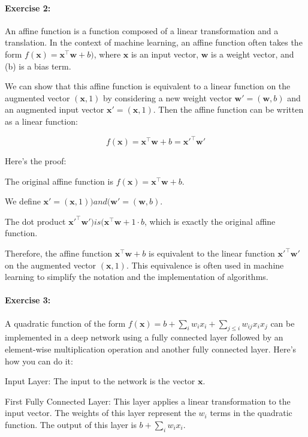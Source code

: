 \paragraph{Exercise 2:}

An affine function is a function composed of a linear transformation and a translation.
In the context of machine learning, an affine function often takes the form \(f(\mathbf{x}) = \mathbf{x}^\top \mathbf{w} + b)\), where \(\mathbf{x}\) is an input vector, \(\mathbf{w}\) is a weight vector, and (b) is a bias term.

We can show that this affine function is equivalent to a linear function on the augmented vector \((\mathbf{x}, 1)\) by considering a new weight vector \(\mathbf{w}' = (\mathbf{w}, b)\) and an augmented input vector \(\mathbf{x}' = (\mathbf{x}, 1)\).
Then the affine function can be written as a linear function:

\[
	f(\mathbf{x}) = \mathbf{x}^\top \mathbf{w} + b = \mathbf{x}'^\top \mathbf{w}'
\]


Here’s the proof:

The original affine function is \(f(\mathbf{x}) = \mathbf{x}^\top \mathbf{w} + b\).

We define \(\mathbf{x}' = (\mathbf{x}, 1)) and (\mathbf{w}' = (\mathbf{w}, b)\).

The dot product \(\mathbf{x}'^\top \mathbf{w}') is (\mathbf{x}^\top \mathbf{w} + 1 \cdot b\), which is exactly the original affine function.

Therefore, the affine function \(\mathbf{x}^\top \mathbf{w} + b\) is equivalent to the linear function \(\mathbf{x}'^\top \mathbf{w}'\) on the augmented vector \((\mathbf{x}, 1)\).
This equivalence is often used in machine learning to simplify the notation and the implementation of algorithms.

\paragraph{Exercise 3:}

A quadratic function of the form \(f(\mathbf{x}) = b + \sum_i w_i x_i + \sum_{j \leq i} w_{ij} x_{i} x_{j}\) can be implemented in a deep network using a fully connected layer followed by an element-wise multiplication operation and another fully connected layer.
Here’s how you can do it:

Input Layer: The input to the network is the vector \(\mathbf{x}\).

First Fully Connected Layer: This layer applies a linear transformation to the input vector.
The weights of this layer represent the \(w_i\) terms in the quadratic function. The output of this layer is \(b + \sum_i w_i x_i\).

